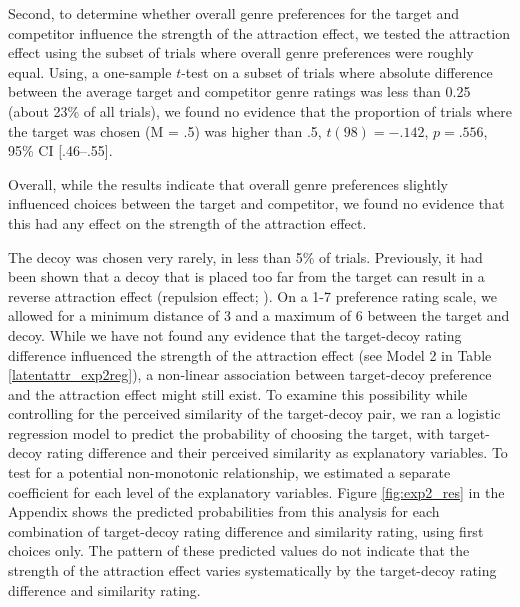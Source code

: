 \documentclass[12pt, a4paper]{article}
\begin{document}
Second, to determine whether overall genre preferences for the target and competitor influence the strength of the attraction effect, we tested the attraction effect using the subset of trials where overall genre preferences were roughly equal. Using, a one-sample $t$-test on a subset of trials where absolute difference between the average target and competitor genre ratings was less than 0.25 (about 23\% of all trials), we found no evidence that the proportion of trials where the target was chosen (M = .5) was higher than .5, $t(98)=-.142$, $p=.556$, 95\% CI [.46--.55].
  
Overall, while the results indicate that overall genre preferences slightly influenced choices between the target and competitor, we found no evidence that this had any effect on the strength of the attraction effect.

The decoy was chosen very rarely, in less than 5\% of trials. Previously, it had been shown that a decoy that is placed too far from the target can result in a reverse attraction effect (repulsion effect; ). On a 1-7 preference rating scale, we allowed for a minimum distance of 3 and a maximum of 6 between the target and decoy. While we have not found any evidence that the target-decoy rating difference influenced the strength of the attraction effect (see Model 2 in Table \ref{latentattr_exp2reg}), a non-linear association between target-decoy preference and the attraction effect might still exist. To examine this possibility while controlling for the perceived similarity of the target-decoy pair, we ran a logistic regression model to predict the probability of choosing the target, with target-decoy rating difference and their perceived similarity as explanatory variables. To test for a potential non-monotonic relationship, we estimated a separate coefficient for each level of the explanatory variables. Figure \ref{fig:exp2_res} in the Appendix shows the predicted probabilities from this analysis for each combination of target-decoy rating difference and similarity rating, using first choices only. The pattern of these predicted values do not indicate that the strength of the attraction effect varies systematically by the target-decoy rating difference and similarity rating.
\end{document}
